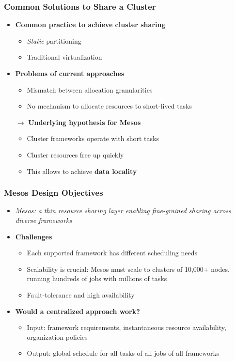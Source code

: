 \begin{frame}
\frametitle{Common Solutions to Share a Cluster}
\begin{itemize}
	\item {\bf Common practice to achieve cluster sharing}
	\begin{itemize}
		\item {\it Static} partitioning
		\item Traditional virtualization
	\end{itemize}
	\item {\bf Problems of current approaches}
	\begin{itemize}
		\item Mismatch between allocation granularities
		\item No mechanism to allocate resources to short-lived tasks
	\end{itemize}
	\item[$\to$] {\bf Underlying hypothesis for Mesos}
	\begin{itemize}
		\item Cluster frameworks operate with short tasks
		\item Cluster resources free up quickly
		\item This allows to achieve {\bf data locality}
	\end{itemize}
\end{itemize}
\end{frame}

\begin{frame}
\frametitle{Mesos Design Objectives}
\begin{itemize}
	\item {\it Mesos: a thin resource sharing layer enabling fine-grained sharing across diverse frameworks}

	\item {\bf Challenges}
	\begin{itemize}
		\item Each supported framework has different scheduling needs
		\item Scalability is crucial: Mesos must scale to clusters of 10,000+ nodes, running hundreds of jobs with millions of tasks
		\item Fault-tolerance and high availability
	\end{itemize}

	\item {\bf Would a centralized approach work?}
	\begin{itemize}
		\item Input: framework requirements, instantaneous resource availability, organization policies
		\item Output: global schedule for all tasks of all jobs of all frameworks
	\end{itemize}
\end{itemize}
\end{frame}

